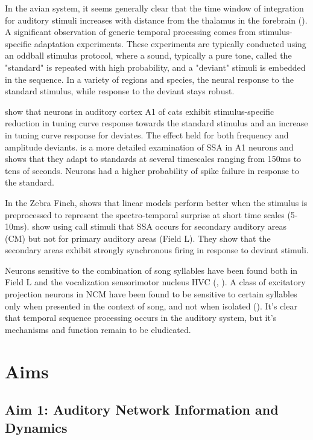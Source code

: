 \documentclass[12pt,article,oneside]{memoir}
\begin{document}
In the avian system, it seems generally clear that the time window of
integration for auditory stimuli increases with distance from the thalamus
in the forebrain (\cite{Kim2011a}). A significant observation of generic temporal
processing comes from stimulus-specific adaptation experiments. These experiments
are typically conducted using an oddball stimulus protocol, where a sound, typically a pure tone,
called the "standard" is repeated with high
probability, and a "deviant" stimuli is embedded in the sequence. In a variety of
regions and species, the neural response to the standard stimulus, while
response to the deviant stays robust.

\cite{Ulanovsky2003} show that neurons in auditory cortex A1 of cats exhibit stimulus-specific
reduction in tuning curve response towards the standard stimulus and an increase
in tuning curve response for deviates. The effect held for both frequency and amplitude deviants. 
\cite{Ulanovsky2004} is a more detailed examination of SSA in A1 neurons and shows that they adapt to
standards at several timescales ranging from 150ms to tens of seconds. Neurons had a higher probability of
spike failure in response to the standard.

In the Zebra Finch, \cite{Gill2008} shows
that linear models perform better when the stimulus is preprocessed to represent the spectro-temporal
surprise at short time scales (5-10ms). \cite{Beckers2012} show using call stimuli that SSA occurs for secondary
auditory areas (CM) but not for primary auditory areas (Field L). They show that the secondary
areas exhibit strongly synchronous firing in response to deviant stimuli. 

Neurons sensitive to the combination of song syllables have been found both in Field L and the
vocalization sensorimotor nucleus HVC (\cite{Margoliash1992}, \cite{Lewicki1996}). A class of
excitatory projection neurons in NCM have been found to be sensitive to certain syllables only
when presented in the context of song, and not when isolated (\cite{Schneider2013}). It's clear
that temporal sequence processing occurs in the auditory system, but it's mechanisms and function
remain to be eludicated.


\section{Aims}

\subsection{Aim 1: Auditory Network Information and Dynamics}
\end{document}

